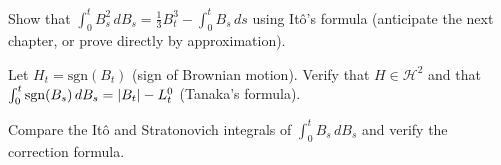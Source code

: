 \begin{exercise}
Show that $\int_0^t B_s^2 \, dB_s = \frac{1}{3} B_t^3 - \int_0^t B_s \, ds$
using It\^o's formula (anticipate the next chapter, or prove directly by
approximation).
\end{exercise}

\begin{exercise}
Let $H_t = \text{sgn}(B_t)$ (sign of Brownian motion). Verify that
$H \in \mathcal{H}^2$ and that
$\int_0^t \text{sgn}(B_s) \, dB_s = \left| B_t \right| - L_t^0$ (Tanaka's formula).
\end{exercise}

\begin{exercise}
Compare the It\^o and Stratonovich integrals of $\int_0^t B_s \, dB_s$ and
verify the correction formula.
\end{exercise}
